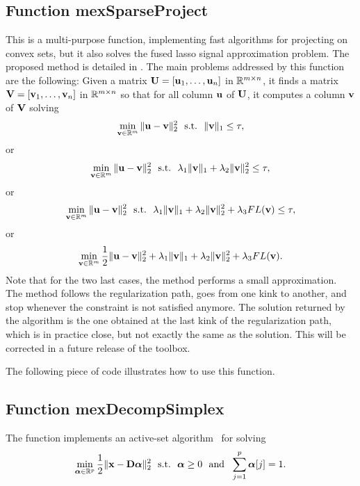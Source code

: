 \documentclass[a4paper, 11pt]{article}
\begin{document}
\subsection{Function mexSparseProject}
This is a multi-purpose function, implementing fast algorithms for projecting
on convex sets, but it also solves the fused lasso signal approximation
problem. The proposed method is detailed in \cite{mairal9}.  The main problems
addressed by this function are the following: Given a matrix
${\mathbf U}=[{\mathbf u}_1,\ldots,{\mathbf u}_n]$ in ${\mathbb R}^{m \times n}$, it finds a matrix
${\mathbf V}=[{\mathbf v}_1,\ldots,{\mathbf v}_n]$ in ${\mathbb R}^{m \times n}$ so that for all column ${\mathbf u}$ of ${\mathbf U}$,
   it computes a column ${\mathbf v}$ of ${\mathbf V}$ solving
   \begin{equation}
   \min_{{\mathbf v} \in {\mathbb R}^m} \|{\mathbf u}-{\mathbf v}\|_2^2  ~~\text{s.t.}~~ \|{\mathbf v}\|_1 \leq \tau,
   \end{equation}
   or
   \begin{equation}
   \min_{{\mathbf v} \in {\mathbb R}^m} \|{\mathbf u}-{\mathbf v}\|_2^2  ~~\text{s.t.}~~ \lambda_1\|{\mathbf v}\|_1 +\lambda_2\|{\mathbf v}\|_2^2\leq \tau,
   \end{equation}
   or
   \begin{equation}
   \min_{{\mathbf v} \in {\mathbb R}^m} \|{\mathbf u}-{\mathbf v}\|_2^2  ~~\text{s.t.}~~ \lambda_1\|{\mathbf v}\|_1 +\lambda_2\|{\mathbf v}\|_2^2+ \lambda_3 FL({\mathbf v}) \leq \tau,
   \end{equation}
   or
   \begin{equation}
   \min_{{\mathbf v} \in {\mathbb R}^m} \frac{1}{2}\|{\mathbf u}-{\mathbf v}\|_2^2 + \lambda_1\|{\mathbf v}\|_1 +\lambda_2\|{\mathbf v}\|_2^2+ \lambda_3 FL({\mathbf v}).
   \end{equation}
   Note that for the two last cases, the method performs a small approximation.
   The method follows the regularization path, goes from one kink to another, and
   stop whenever the constraint is not satisfied anymore. The solution returned
   by the algorithm is the one obtained at the last kink of the regularization path,
   which is in practice close, but not exactly the same as the solution.
   This will be corrected in a future release of the toolbox.


The following piece of code illustrates how to use this function.


\subsection{Function mexDecompSimplex}
The function implements an active-set algorithm~\cite{ChenCVPR} for solving
\begin{displaymath}
   \min_{{\boldsymbol\alpha} \in {\mathbb R}^p} \frac{1}{2}\|{\mathbf x}-{\mathbf D}{\boldsymbol\alpha}\|_2^2 ~~\text{s.t.}~~ {\boldsymbol\alpha} \geq 0 ~~\text{and}~~ \sum_{j=1}^p {\boldsymbol\alpha}[j] = 1.
\end{displaymath}

\end{document}
